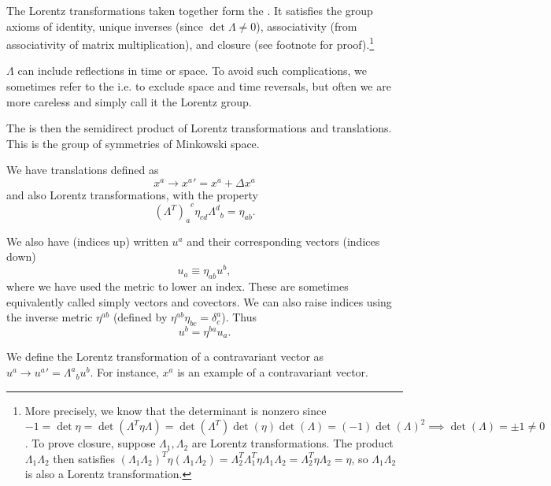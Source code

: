 \begin{defn}\label{lorentzgroup}
The Lorentz transformations taken together form the . It satisfies the group axioms of identity, unique inverses (since $\det\Lambda \neq 0$), associativity (from associativity of matrix multiplication), and closure (see footnote for proof).\footnote{More precisely, we know that the determinant is nonzero since $-1=\det{\eta}=\det(\Lambda^T\eta\Lambda)=\det(\Lambda^T)\det(\eta)\det(\Lambda)=(-1)\det(\Lambda)^2\implies \det(\Lambda)=\pm 1 \neq 0$. To prove closure, suppose $\Lambda_1,\Lambda_2$ are Lorentz transformations. The product $\Lambda_1\Lambda_2$ then satisfies $(\Lambda_1\Lambda_2)^T \eta(\Lambda_1\Lambda_2)= \Lambda_2^T \Lambda_1^T \eta\Lambda_1 \Lambda_2 = \Lambda_2^T \eta \Lambda_2 = \eta$, so $\Lambda_1\Lambda_2$ is also a Lorentz transformation.}
\end{defn}

$\Lambda$ can include reflections in time or space. To avoid such complications, we sometimes refer to the  i.e. to exclude space and time reversals, but often we are more careless and simply call it the Lorentz group.
\begin{defn}
The  is then the semidirect product of Lorentz transformations and translations. This is the group of symmetries of Minkowski space.
\end{defn}
We have translations defined as
$$x^a\to {x^a}'=x^a+\Delta x^a$$
and also Lorentz transformations, with the property
$${(\Lambda^T)_a}^c \eta_{cd} {\Lambda^d}_b=\eta_{ab}.$$


\begin{defn}
We also have  (indices up) written $u^a$ and their corresponding  vectors (indices down) $$u_a\equiv\eta_{ab}u^b,$$ where we have used the metric to lower an index. These are sometimes equivalently called simply vectors and covectors. We can also raise indices using the inverse metric $\eta^{ab}$ (defined by $\eta^{ab}\eta_{bc}=\delta^a_c$). Thus
$$u^b=\eta^{ba}u_a.$$
\end{defn}

We define the Lorentz transformation of a contravariant vector as
$u^a\to {u^a}' = {\Lambda^a}_b u^b.$  For instance, $x^a$ is an example of a contravariant vector.

